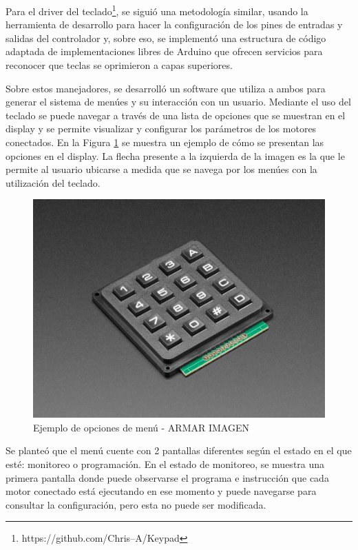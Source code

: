 Para el driver del teclado\footnote{https://github.com/Chris--A/Keypad}, se siguió una metodología similar, usando la herramienta de desarrollo para hacer la configuración de los pines de entradas y salidas del controlador y, sobre eso, se implementó una estructura de código adaptada de implementaciones libres de Arduino que ofrecen servicios para reconocer que teclas se oprimieron a capas superiores.

Sobre estos manejadores, se desarrolló un software que utiliza a ambos para generar el sistema de menúes y su interacción con un usuario. Mediante el uso del teclado se puede navegar a través de una lista de opciones que se muestran en el display y se permite visualizar y configurar los parámetros de los motores conectados. En la Figura \ref{fig:menu} se muestra un ejemplo de cómo se presentan las opciones en el display. La flecha presente a la izquierda de la imagen es la que le permite al usuario ubicarse a medida que se navega por los menúes con la utilización del teclado.

\begin{figure}[htbp]
	\centering
	\includegraphics[scale=.6]{./Figures/keypad.JPG}
	\caption{Ejemplo de opciones de menú - ARMAR IMAGEN}
	\label{fig:menu}
\end{figure}

Se planteó que el menú cuente con 2 pantallas diferentes según el estado en el que esté: monitoreo o programación. En el estado de monitoreo, se muestra una primera pantalla donde puede observarse el programa e instrucción que cada motor conectado está ejecutando en ese momento y puede navegarse para consultar la configuración, pero esta no puede ser modificada.

